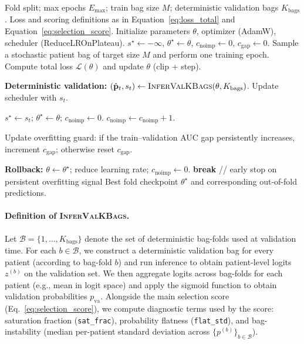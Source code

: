 \begin{algorithm}[H]
\caption{Fold training with deterministic $K$-bag validation and rollback}
\label{alg:training_final}
\footnotesize
\begin{algorithmic}[1]
\REQUIRE Fold split; max epochs $E_{\max}$; train bag size $M$; deterministic validation bags $K_{\text{bags}}$.
\REQUIRE Loss and scoring definitions as in Equation~\ref{eq:loss_total} and Equation~\ref{eq:selection_score}. 
\STATE Initialize parameters $\theta$, optimizer (AdamW), scheduler (ReduceLROnPlateau).
\STATE $s^\star\leftarrow -\infty$, $\theta^\star\leftarrow \theta$, $c_{\text{noimp}}\leftarrow 0$, $c_{\text{gap}}\leftarrow 0$.
    \STATE Sample a stochastic patient bag of target size $M$ and perform one training epoch.
    \STATE Compute total loss $\mathcal{L}(\theta)$ and update $\theta$ (clip + step).

    \STATE \textbf{Deterministic validation:} $(\hat{\mathbf{p}}_t, s_t)\leftarrow \textsc{InferValKBags}(\theta, K_{\text{bags}})$.
    \STATE Update scheduler with $s_t$.

        \STATE $s^\star\leftarrow s_t$; $\theta^\star\leftarrow \theta$; $c_{\text{noimp}}\leftarrow 0$.
    \ELSE
        \STATE $c_{\text{noimp}}\leftarrow c_{\text{noimp}}+1$.
    \ENDIF

    \STATE Update overfitting guard: if the train--validation AUC gap persistently increases, increment $c_{\text{gap}}$; otherwise reset $c_{\text{gap}}$.


        \STATE \textbf{Rollback:} $\theta\leftarrow \theta^\star$; reduce learning rate; $c_{\text{noimp}}\leftarrow 0$.
    \ENDIF
        \STATE \textbf{break} \hfill // early stop on persistent overfitting signal
    \ENDIF
\ENDFOR
\RETURN Best fold checkpoint $\theta^\star$ and corresponding out-of-fold predictions.
\end{algorithmic}
\end{algorithm}



\paragraph{Definition of \textsc{InferValKBags}.}
Let $\mathcal{B}=\{1,\dots,K_{\text{bags}}\}$ denote the set of deterministic bag-folds used at validation time.
For each $b\in\mathcal{B}$, we construct a deterministic validation bag for every patient (according to bag-fold $b$) and run inference to obtain patient-level logits $z^{(b)}$ on the validation set.
We then aggregate logits across bag-folds for each patient (e.g., mean in logit space) and apply the sigmoid function to obtain validation probabilities $p_{\text{va}}$.
Alongside the main selection score (Eq.~\ref{eq:selection_score}), we compute diagnostic terms used by the score: saturation fraction (\texttt{sat\_frac}), probability flatness (\texttt{flat\_std}), and bag-instability (median per-patient standard deviation across $\{p^{(b)}\}_{b\in\mathcal{B}}$).


